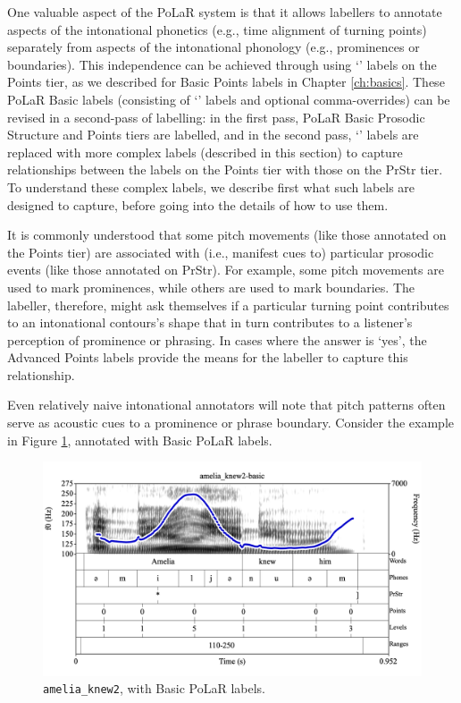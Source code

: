 \documentclass[11pt, twoside]{memoir}
\def\textlabel#1{{\relsize{-.5}\fontspec[Mapping=tex-text]{Roboto Mono}{#1}}}
\begin{document}
One valuable aspect of the PoLaR system is that it allows labellers to annotate aspects of the intonational phonetics (e.g., time alignment of turning points) separately from aspects of the intonational phonology (e.g., prominences or boundaries). This independence can be achieved through using ‘\textlabel{0}’ labels on the Points tier, as we described for Basic Points labels in Chapter \ref{ch:basics}. These PoLaR Basic labels (consisting of ‘\textlabel{0}’ labels and optional comma-overrides) can be revised in a second-pass of labelling: in the first pass, PoLaR Basic Prosodic Structure and Points tiers are labelled, and in the second pass, ‘\textlabel{0}’ labels are replaced with more complex labels (described in this section) to capture relationships between the  labels on the Points tier with those on the PrStr tier. To understand these complex labels, we describe first what such labels are designed to capture, before going into the details of how to use them.

It is commonly understood that some pitch movements (like those annotated on the Points tier) are associated with (i.e., manifest cues to) particular prosodic events (like those annotated on PrStr). For example, some pitch movements are used to mark prominences, while others are used to mark boundaries. The labeller, therefore, might ask themselves if a particular turning point contributes to an intonational contours’s shape that in turn contributes to a listener’s perception of prominence or phrasing. In cases where the answer is ‘yes’, the Advanced Points labels provide the means for the labeller to capture this relationship.

Even relatively naive intonational annotators will note that pitch patterns often serve as acoustic cues to a prominence or phrase boundary. Consider the example in Figure \ref{fig:amelia_knew2 in Adv}, annotated with Basic PoLaR labels.

\begin{figure}[H]
\centering
%
\includegraphics[width=.875\linewidth]{Points-amelia_knew2.png}
%
\caption{\texttt{amelia\_knew2}, with Basic PoLaR labels.%
\label{fig:amelia_knew2 in Adv}%
}
\end{figure}
\end{document}
